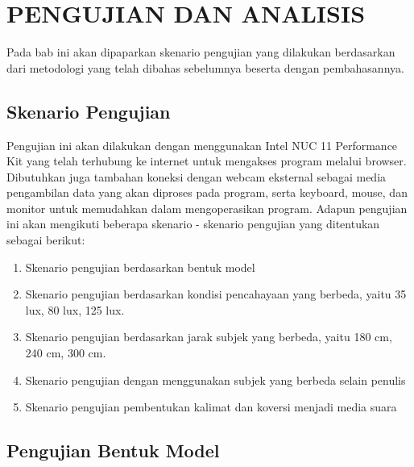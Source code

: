 \chapter{PENGUJIAN DAN ANALISIS}
\label{chap:pengujiananalisis}


Pada bab ini akan dipaparkan skenario pengujian yang  dilakukan berdasarkan dari metodologi yang telah dibahas sebelumnya beserta dengan pembahasannya.

\section{Skenario Pengujian}
\label{sec:skenariopengujian}

Pengujian ini akan dilakukan dengan menggunakan Intel NUC 11 Performance Kit yang telah terhubung ke internet untuk mengakses program melalui browser. Dibutuhkan juga tambahan koneksi dengan webcam eksternal sebagai media pengambilan data yang akan diproses pada program, serta keyboard, mouse, dan monitor untuk memudahkan dalam mengoperasikan program. Adapun pengujian ini akan mengikuti beberapa skenario - skenario pengujian yang ditentukan sebagai berikut:

\begin{enumerate}
  \item Skenario pengujian berdasarkan bentuk model
  \item Skenario pengujian berdasarkan kondisi pencahayaan yang berbeda, yaitu 35 lux, 80 lux, 125 lux. 
  \item Skenario pengujian berdasarkan jarak subjek yang berbeda, yaitu 180 cm, 240 cm, 300 cm.
  \item Skenario pengujian dengan menggunakan subjek yang berbeda selain penulis
  \item Skenario pengujian pembentukan kalimat dan koversi menjadi media suara
\end{enumerate}

\section{Pengujian Bentuk Model}
\label{sec:analisismodel}

